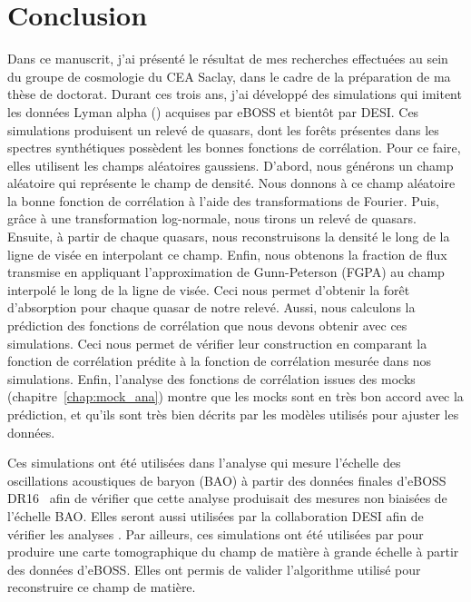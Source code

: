 % 

% 




\chapter{Conclusion}
\thispagestyle{fancy}

Dans ce manuscrit, j'ai présenté le résultat de mes recherches effectuées au sein du groupe de cosmologie du CEA Saclay, dans le cadre de la préparation de ma thèse de doctorat.
Durant ces trois ans, j'ai développé des simulations qui imitent les données Lyman alpha (\lya{}) acquises par eBOSS et bientôt par DESI.
Ces simulations produisent un relevé de quasars, dont les forêts \lya{} présentes dans les spectres synthétiques possèdent les bonnes fonctions de corrélation.
Pour ce faire, elles utilisent les champs aléatoires gaussiens. D'abord, nous générons un champ aléatoire qui représente le champ de densité. Nous donnons à ce champ aléatoire la bonne fonction de corrélation à l'aide des transformations de Fourier.
Puis, grâce à une transformation log-normale, nous tirons un relevé de quasars. Ensuite, à partir de chaque quasars, nous reconstruisons la densité le long de la ligne de visée en interpolant ce champ. Enfin, nous obtenons la fraction de flux transmise en appliquant l'approximation de Gunn-Peterson (FGPA) au champ interpolé le long de la ligne de visée.
Ceci nous permet d'obtenir la forêt d'absorption \lya{} pour chaque quasar de notre relevé.
Aussi, nous calculons la prédiction des fonctions de corrélation que nous devons obtenir avec ces simulations. Ceci nous permet de vérifier leur construction en comparant la fonction de corrélation prédite à la fonction de corrélation mesurée dans nos simulations.
Enfin, l'analyse des fonctions de corrélation issues des mocks (chapitre~\ref{chap:mock_ana}) montre que les mocks sont en très bon accord avec la prédiction, et qu'ils sont très bien décrits par les modèles utilisés pour ajuster les données.


Ces simulations ont été utilisées dans l'analyse qui mesure l'échelle des oscillations acoustiques de baryon (BAO) à partir des données finales d'eBOSS DR16~\autocite{DuMasdesBourboux2020} afin de vérifier que cette analyse produisait des mesures non biaisées de l'échelle BAO. Elles seront aussi utilisées par la collaboration DESI afin de vérifier les analyses \lya{}.
Par ailleurs, ces simulations ont été utilisées par \textcite{Ravoux2020} pour produire une carte tomographique du champ de matière à grande échelle à partir des données d'eBOSS. Elles ont permis de valider l'algorithme utilisé pour reconstruire ce champ de matière.

